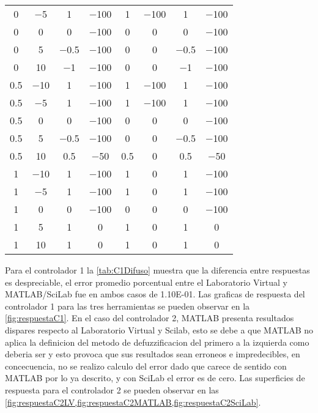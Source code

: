 {\begin{longtable}{c @{\extracolsep{\fill}} ccccccc}
        \num{0}    & \num{-5}  & \num{1}    & \num{-100} & \num{1}   & \num{-100} & \num{1}    & \num{-100}  \\
        \num{0}    & \num{0}   & \num{0}    & \num{-100} & \num{0}   & \num{0}    & \num{0}    & \num{-100}  \\
        \num{0}    & \num{5}   & \num{-0.5} & \num{-100} & \num{0}   & \num{0}    & \num{-0.5} & \num{-100}  \\
        \num{0}    & \num{10}  & \num{-1}   & \num{-100} & \num{0}   & \num{0}    & \num{-1}   & \num{-100}  \\
        \num{0.5}  & \num{-10} & \num{1}    & \num{-100} & \num{1}   & \num{-100} & \num{1}    & \num{-100}  \\
        \num{0.5}  & \num{-5}  & \num{1}    & \num{-100} & \num{1}   & \num{-100} & \num{1}    & \num{-100}  \\
        \num{0.5}  & \num{0}   & \num{0}    & \num{-100} & \num{0}   & \num{0}    & \num{0}    & \num{-100}  \\
        \num{0.5}  & \num{5}   & \num{-0.5} & \num{-100} & \num{0}   & \num{0}    & \num{-0.5} & \num{-100}  \\
        \num{0.5}  & \num{10}  & \num{0.5}  & \num{-50}  & \num{0.5} & \num{0}    & \num{0.5}  & \num{-50}   \\
        \num{1}    & \num{-10} & \num{1}    & \num{-100} & \num{1}   & \num{0}    & \num{1}    & \num{-100}  \\
        \num{1}    & \num{-5}  & \num{1}    & \num{-100} & \num{1}   & \num{0}    & \num{1}    & \num{-100}  \\
        \num{1}    & \num{0}   & \num{0}    & \num{-100} & \num{0}   & \num{0}    & \num{0}    & \num{-100}  \\
        \num{1}    & \num{5}   & \num{1}    & \num{0}    & \num{1}   & \num{0}    & \num{1}    & \num{0}     \\
        \num{1}    & \num{10}  & \num{1}    & \num{0}    & \num{1}   & \num{0}    & \num{1}    & \num{0}     \\
        \bottomrule
        \end{longtable}}

        Para el controlador 1 la \cref{tab:C1Difuso} muestra que la diferencia entre respuestas es despreciable, el error promedio porcentual entre el Laboratorio Virtual y MATLAB/SciLab fue en ambos casos de \num{1.10E-01}. Las graficas de respuesta del controlador 1 para las tres herramientas se pueden observar en la \cref{fig:respuestaC1}. En el caso del controlador 2, MATLAB presenta resultados dispares respecto al Laboratorio Virtual y Scilab, esto se debe a que MATLAB no aplica la definicion del metodo de defuzzificacion del primero a la izquierda como deberia ser y esto provoca que sus resultados sean erroneos e impredecibles, en concecuencia, no se realizo calculo del error dado que carece de sentido con MATLAB por lo ya descrito, y con SciLab el error es de cero. Las superficies de respuesta para el controlador 2 se pueden observar en las \cref{fig:respuestaC2LV,fig:respuestaC2MATLAB,fig:respuestaC2SciLab}.

